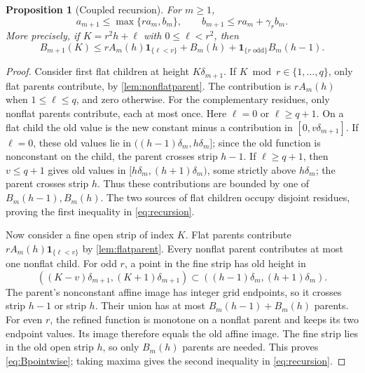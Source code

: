\documentclass[11pt]{article}
\newtheorem{proposition}[theorem]{Proposition}
\theoremstyle{definition}
\theoremstyle{remark}
\newcommand{\ind}{\mathbf 1}
\begin{document}
\begin{proposition}[Coupled recursion]\label{prop:recursion}
For $m\ge1$,
\begin{equation}\label{eq:recursion}
 a_{m+1}\le\max\{ra_m,b_m\},\qquad
 b_{m+1}\le ra_m+\gamma_rb_m.
\end{equation}
More precisely, if $K=r^2h+\ell$ with $0\le\ell<r^2$, then
\begin{equation}\label{eq:Bpointwise}
 B_{m+1}(K)\le rA_m(h)\ind_{\{\ell<v\}}+B_m(h)
 +\ind_{\{r\text{ odd}\}}B_m(h-1).
\end{equation}
\end{proposition}
\begin{proof}
Consider first flat children at height $K\delta_{m+1}$.
If $K\bmod r\in\{1,\ldots,q\}$, only flat parents contribute, by
\cref{lem:nonflatparent}. The contribution is $rA_m(h)$ when
$1\le\ell\le q$, and zero otherwise.
For the complementary residues, only nonflat parents contribute, each at
most once. Here $\ell=0$ or $\ell\ge q+1$.
On a flat child the old value is the new constant minus a contribution in
$[0,v\delta_{m+1}]$.
If $\ell=0$, these old values lie in
$((h-1)\delta_m,h\delta_m]$; since the old function is nonconstant on
the child, the parent crosses strip $h-1$.
If $\ell\ge q+1$, then $v\le q+1$ gives old values in
$[h\delta_m,(h+1)\delta_m)$, some strictly above $h\delta_m$; the parent
crosses strip $h$.
Thus these contributions are bounded by one of $B_m(h-1),B_m(h)$.
The two sources of flat children occupy disjoint residues, proving the
first inequality in \cref{eq:recursion}.

Now consider a fine open strip of index $K$. Flat parents contribute
$rA_m(h)\ind_{\{\ell<v\}}$ by \cref{lem:flatparent}.
Every nonflat parent contributes at most one nonflat child.
For odd $r$, a point in the fine strip has old height in
\[
 ((K-v)\delta_{m+1},(K+1)\delta_{m+1})
 \subset((h-1)\delta_m,(h+1)\delta_m).
\]
The parent's nonconstant affine image has integer grid endpoints, so it
crosses strip $h-1$ or strip $h$. Their union has at most
$B_m(h-1)+B_m(h)$ parents.
For even $r$, the refined function is monotone on a nonflat parent and
keeps its two endpoint values. Its image therefore equals the old affine
image. The fine strip lies in the old open strip $h$, so only $B_m(h)$
parents are needed. This proves \cref{eq:Bpointwise}; taking maxima gives
the second inequality in \cref{eq:recursion}.
\end{proof}
\end{document}
